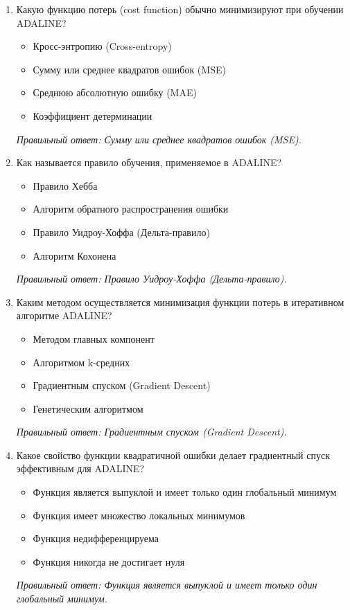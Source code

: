\begin{enumerate}[label=\textbf{\arabic*.}, leftmargin=0pt, itemsep=1.2em]
\item Какую функцию потерь (cost function) обычно минимизируют при обучении ADALINE?
\begin{itemize}[label=$\square$, leftmargin=1.5cm, itemsep=0.2em, topsep=0.3em]
\item Кросс-энтропию (Cross-entropy)
\item Сумму или среднее квадратов ошибок (MSE)
\item Среднюю абсолютную ошибку (MAE)
\item Коэффициент детерминации
\end{itemize}
{\small\textit{Правильный ответ: Сумму или среднее квадратов ошибок (MSE).}}

\item Как называется правило обучения, применяемое в ADALINE?
\begin{itemize}[label=$\square$, leftmargin=1.5cm, itemsep=0.2em, topsep=0.3em]
\item Правило Хебба
\item Алгоритм обратного распространения ошибки
\item Правило Уидроу-Хоффа (Дельта-правило)
\item Алгоритм Кохонена
\end{itemize}
{\small\textit{Правильный ответ: Правило Уидроу-Хоффа (Дельта-правило).}}

\item Каким методом осуществляется минимизация функции потерь в итеративном алгоритме ADALINE?
\begin{itemize}[label=$\square$, leftmargin=1.5cm, itemsep=0.2em, topsep=0.3em]
\item Методом главных компонент
\item Алгоритмом k-средних
\item Градиентным спуском (Gradient Descent)
\item Генетическим алгоритмом
\end{itemize}
{\small\textit{Правильный ответ: Градиентным спуском (Gradient Descent).}}

\item Какое свойство функции квадратичной ошибки делает градиентный спуск эффективным для ADALINE?
\begin{itemize}[label=$\square$, leftmargin=1.5cm, itemsep=0.2em, topsep=0.3em]
\item Функция является выпуклой и имеет только один глобальный минимум
\item Функция имеет множество локальных минимумов
\item Функция недифференцируема
\item Функция никогда не достигает нуля
\end{itemize}
{\small\textit{Правильный ответ: Функция является выпуклой и имеет только один глобальный минимум.}}


\end{enumerate}
